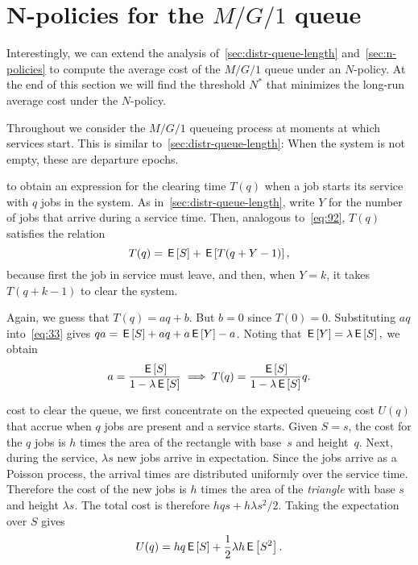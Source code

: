 


\section{N-policies for the $M/G/1$ queue}
\label{sec:n-policies-mg1}

Interestingly, we can extend the analysis of~\cref{sec:distr-queue-length} and~\cref{sec:n-policies} to compute the average cost of the $M/G/1$ queue under an $N$-policy.
At the end of this section we will find the threshold $N^*$ that minimizes the long-run average cost under the $N$-policy.

Throughout we consider the $M/G/1$ queueing process at moments at which services start.
This is similar to~\cref{sec:distr-queue-length}: When the system is not empty, these are departure epochs.


 to obtain an expression for the clearing time $T(q)$ when a job starts its service with $q$ jobs in the system.
As in~\cref{sec:distr-queue-length}, write $Y$ for the number of jobs that arrive during a service time.
Then, analogous to~\cref{eq:92}, $T(q)$ satisfies the relation
\begin{equation}\label{eq:33}
  T(q) = \,\mathsf{E}\left[S\right] + \,\mathsf{E}\left[T(q+Y-1)\right],
\end{equation}
because first the job in service must leave, and then,  when $Y=k$,  it takes $T(q+k-1)$ to clear the system.

Again, we guess that $T(q) = a q + b$.
But $b=0$ since $T(0)=0$.
Substituting $a q$ into~\cref{eq:33} gives $q a =\,\mathsf{E}\left[S\right] + aq + a\,\mathsf{E}\left[Y\right] - a$. Noting that $\,\mathsf{E}\left[Y\right] = \lambda \,\mathsf{E}\left[S\right],$ we  obtain
\begin{equation*}
a = \frac{\,\mathsf{E}\left[S\right]}{1-\lambda \,\mathsf{E}\left[S\right]} \implies T(q) = \frac{\,\mathsf{E}\left[S\right]}{1-\lambda \,\mathsf{E}\left[S\right]}q.
\end{equation*}

 cost to clear the queue, we first concentrate on the expected queueing cost $U(q)$ that accrue when $q$ jobs are present and a service starts.
Given $S=s$, the cost for the $q$ jobs is $h$ times the area of the rectangle with base~$s$ and height~$q$.
Next, during the service, $\lambda s$ new jobs arrive in expectation.
Since the jobs arrive as a Poisson process, the arrival times are distributed uniformly over the service time.
Therefore the cost of the new jobs is $h$ times the area of the \emph{triangle} with base $s$ and height $\lambda s$.
The total cost is therefore $hqs + h \lambda s^2/2$.
Taking the expectation over $S$ gives
\begin{equation*}
U(q)  =  h q \,\mathsf{E}\left[S\right] +  \frac 12 \lambda h \,\mathsf{E}\left[S^2\right].
\end{equation*}


